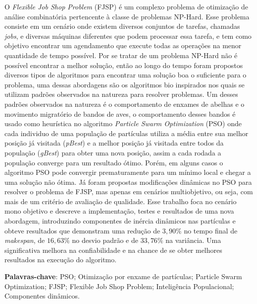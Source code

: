 \par

\begin{resumo}
    O \textit{Flexible Job Shop Problem} (FJSP) é um complexo problema de otimização de análise combinatória pertencente à classe de problemas NP-Hard. Esse problema consiste em um cenário onde existem diversos conjuntos de tarefas, chamadas \textit{jobs}, e diversas máquinas diferentes que podem processar essa tarefa, e tem como objetivo encontrar um agendamento que execute todas as operações na menor quantidade de tempo possível. Por se tratar de um problema NP-Hard não é possível encontrar a melhor solução, então ao longo do tempo foram propostos diversos tipos de algoritmos para encontrar uma solução boa o suficiente para o problema, uma dessas abordagens são os algoritmos bio inspirados nos quais se utilizam padrões observados na natureza para resolver problemas. Um desses padrões observados na natureza é o comportamento de enxames de abelhas e o movimento migratório de bandos de aves, o comportamento desses bandos é usado como heurística no algoritmo \textit{Particle Swarm Optimization} (PSO) onde cada individuo de uma população de partículas utiliza a média entre sua melhor posição já visitada (\textit{pBest}) e a melhor posição já visitada entre todos da população (\textit{gBest}) para obter uma nova posição, assim a cada rodada a população converge para um resultado ótimo. Porém, em alguns casos o algoritmo PSO pode convergir prematuramente para um mínimo local e chegar a uma solução não ótima. Já foram propostas modificações dinâmicas no PSO para resolver o problema de FJSP, mas apenas em cenários multiobjetivo, ou seja, com mais de um critério de avaliação de qualidade. Esse trabalho foca no cenário mono objetivo e descreve a implementação, testes e resultados de uma nova abordagem, introduzindo componentes de inércia dinâmicos nas partículas e obteve resultados que demonstram uma redução de $3,90\%$ no tempo final de \textit{makespan}, de $16,63\%$ no desvio padrão e de $33,76\%$ na variância. Uma significativa melhora na confiabilidade e na chance de se obter melhores resultados na execução do algoritmo.\vspace{\onelineskip}

\noindent\textbf{Palavras-chave}: PSO; Otimização por enxame de partículas; Particle Swarm Optimization; FJSP; Flexible Job Shop Problem; Inteligência Populacional; Componentes dinâmicos.
\end{resumo}
